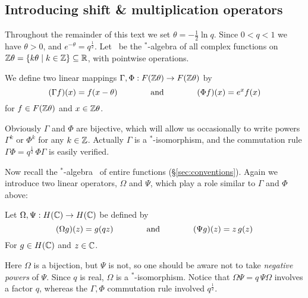 \subsection{Introducing shift \& multiplication operators}
\label{par:introducing_shift_and_multiplication_operators}


Throughout the remainder of this text we set \mbox{$\theta = -\frac{1}{2} \ln q$}\@.
Since $0<q<1$ we have $\theta>0$, and $e^{-\theta} = q^\frac{1}{2}$.
Let \FZ\ be the $^*$-algebra of all complex functions on
$\Zt = \{ k \theta \mid k\in \ZZ \} \subseteq \RR$,
with pointwise operations.

\begin{defn}
We define two linear mappings
$\Gamma, \Phi : \FZ \rarr \FZ$ by
$$  (\Gamma f)(x) = f(x-\theta)     \andspace{4em}     (\Phi f)(x) = e^x f(x) $$
for $f\in \FZ$ and $x\in \Zt$.
\end{defn}

Obviously $\Gamma$ and $\Phi$ are bijective, which will allow us occasionally
to write powers $\Gamma^k$ or $\Phi^k$ for any $k\in\ZZ$.
Actually $\Gamma$ is a $^*$-isomorphism, and the commutation rule
$\Gamma \Phi = q^\frac{1}{2} \, \Phi \Gamma$ is easily verified.
\vspace{2ex}

Now recall the $^*$-algebra \HC\ of entire functions (\S \ref{sec:conventions}).
Again we introduce two linear operators, $\Omega$ and $\Psi$,
which play a role similar to $\Gamma$ and $\Phi$ above:

\begin{defn}
Let $\Omega,\Psi : \HC \rarr \HC$ be defined by
$$(\Omega g)(z) = g(qz)       \andspace{4em}      (\Psi g)(z) = z\, g(z) $$
For $g\in\HC$ and $z\in\CC$.
\end{defn}

Here $\Omega$ is a bijection, but $\Psi$ is not, so one should be aware not
to take {\em negative powers\/} of $\Psi$.
Since $q$ is real, $\Omega$ is a $^*$-isomorphism.
Notice that $\Omega\Psi = q\, \Psi\Omega$ involves a factor $q$,
whereas the $\Gamma,\Phi$ commutation rule involved $q^\frac{1}{2}$.
